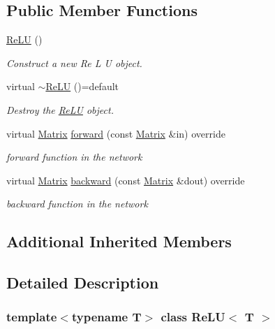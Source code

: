 \subsection*{Public Member Functions}
\begin{DoxyCompactItemize}
\item 
\mbox{\hyperlink{class_re_l_u_ad378d979e537b8af65513b3cb9bfe2b1}{Re\+LU}} ()
\begin{DoxyCompactList}\small\item\em Construct a new Re L U object. \end{DoxyCompactList}\item 
virtual \mbox{\hyperlink{class_re_l_u_a6694b0386daea4398ad932f92382e206}{$\sim$\+Re\+LU}} ()=default
\begin{DoxyCompactList}\small\item\em Destroy the \mbox{\hyperlink{class_re_l_u}{Re\+LU}} object. \end{DoxyCompactList}\item 
virtual \mbox{\hyperlink{class_re_l_u_a3d1448f06335a4ab7227ec31a43a410f}{Matrix}} \mbox{\hyperlink{class_re_l_u_aef903f5e7d309e76f49abc34043354ce}{forward}} (const \mbox{\hyperlink{class_re_l_u_a3d1448f06335a4ab7227ec31a43a410f}{Matrix}} \&in) override
\begin{DoxyCompactList}\small\item\em forward function in the network \end{DoxyCompactList}\item 
virtual \mbox{\hyperlink{class_re_l_u_a3d1448f06335a4ab7227ec31a43a410f}{Matrix}} \mbox{\hyperlink{class_re_l_u_aa634f43909614b979d84f5d4e5480bb4}{backward}} (const \mbox{\hyperlink{class_re_l_u_a3d1448f06335a4ab7227ec31a43a410f}{Matrix}} \&dout) override
\begin{DoxyCompactList}\small\item\em backward function in the network \end{DoxyCompactList}\end{DoxyCompactItemize}
\subsection*{Additional Inherited Members}


\subsection{Detailed Description}
\subsubsection*{template$<$typename T$>$\newline
class Re\+L\+U$<$ T $>$}

